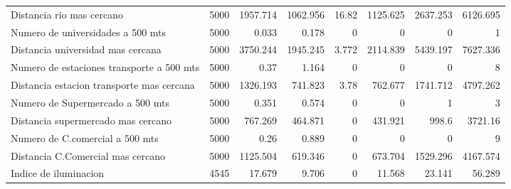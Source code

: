 \begin{table}[!htbp]
{\begin{tabular}{lrrrrrrr}
Distancia rio mas cercano & 5000 & 1957.714 & 1062.956 & 16.82 & 1125.625 & 2637.253 & 6126.695 \\ 
Numero de universidades a 500 mts & 5000 & 0.033 & 0.178 & 0 & 0 & 0 & 1 \\ 
Distancia universidad mas cercana & 5000 & 3750.244 & 1945.245 & 3.772 & 2114.839 & 5439.197 & 7627.336 \\ 
Numero de estaciones transporte a 500 mts & 5000 & 0.37 & 1.164 & 0 & 0 & 0 & 8 \\ 
Distancia estacion transporte mas cercana & 5000 & 1326.193 & 741.823 & 3.78 & 762.677 & 1741.712 & 4797.262 \\ 
Numero de Supermercado a 500 mts & 5000 & 0.351 & 0.574 & 0 & 0 & 1 & 3 \\ 
Distancia supermercado mas cercano & 5000 & 767.269 & 464.871 & 0 & 431.921 & 998.6 & 3721.16 \\ 
Numero de C.comercial a 500 mts & 5000 & 0.26 & 0.889 & 0 & 0 & 0 & 9 \\ 
Distancia C.Comercial mas cercano & 5000 & 1125.504 & 619.346 & 0 & 673.704 & 1529.296 & 4167.574 \\ 
Indice de iluminacion & 4545 & 17.679 & 9.706 & 0 & 11.568 & 23.141 & 56.289\\ 
\hline
\hline
\end{tabular}
}
\end{table}

